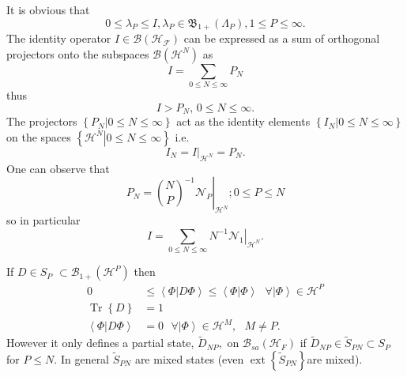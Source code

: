 \documentclass[aps,preprint]{revtex4}%
\begin{document}
It is obvious that
\begin{equation}
0\leq\lambda_{P}\leq I,\lambda_{P}\in\mathfrak{B}_{1+}\left(  \Lambda
_{P}\right)  ,1\leq P\leq\infty.
\end{equation}
The identity operator $I\in\mathcal{B}\left(  \mathcal{H}_{\mathcal{F}%
}\right)  $ can be expressed as a sum of orthogonal projectors onto the
subspaces $\mathcal{B}\left(  \mathcal{H}^{N}\right)  $ as%
\begin{equation}
I=\sum_{0\leq N\leq\infty}P_{N}%
\end{equation}
thus
\begin{equation}
I>P_{N},\,0\leq N\leq\infty.
\end{equation}
The projectors $\left\{  \left.  P_{N}\right\vert 0\leq N\leq\infty\right\}  $
act as the identity elements $\left\{  \left.  I_{N}\right\vert 0\leq
N\leq\infty\right\}  $ on the spaces $\left\{  \left.  \mathcal{H}%
^{N}\right\vert 0\leq N\leq\infty\right\}  $ i.e.%
\begin{equation}
I_{N}=\left.  I\right\vert _{\mathcal{H}^{N}}=P_{N}.
\end{equation}
One can observe that
\begin{equation}
P_{N}=\left.  \binom{N}{P}^{-1}\mathcal{N}_{P}\right\vert _{\mathcal{H}^{N}%
};0\leq P\leq N
\end{equation}
so in particular
\begin{equation}
I=\sum_{0\leq N\leq\infty}\left.  N^{-1}\mathcal{N}_{1}\right\vert
_{\mathcal{H}^{N}}.
\end{equation}


If $D\in S_{P}$ $\subset\mathcal{B}_{1+}\left(  \mathcal{H}^{P}\right)  $
then
\begin{align}
0  &  \leq\left\langle \left.  \Phi\right\vert D\Phi\right\rangle
\leq\left\langle \left.  \Phi\right\vert \Phi\right\rangle \text{ }%
\forall\left\vert \Phi\right\rangle \in\mathcal{H}^{P}\\
\operatorname{Tr}\left\{  D\right\}   &  =1\\
\left\langle \left.  \Phi\right\vert D\Phi\right\rangle  &  =0\text{ }%
\forall\left\vert \Phi\right\rangle \in\mathcal{H}^{M},\text{ }M\neq P.
\end{align}
However it only defines a partial state, $\tilde{D}_{NP},$ on $\mathcal{B}%
_{sa}\left(  \mathcal{H}_{F}\right)  $ if $\tilde{D}_{NP}\in\tilde{S}%
_{PN}\subset S_{P}$ for $P\leq N.$ In general $\tilde{S}_{PN}$ are mixed
states (even $\operatorname*{ext}\left\{  \tilde{S}_{PN}\right\}  $are
mixed)$.$
\end{document}
